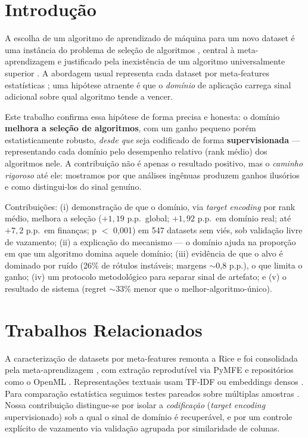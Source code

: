 \documentclass[12pt]{article}
\begin{document}
\section{Introdução}

A escolha de um algoritmo de aprendizado de máquina para um novo dataset é uma
instância do problema de seleção de algoritmos \cite{rice1976algorithm}, central
à meta-aprendizagem \cite{brazdil2009metalearning,vanschoren2018metalearning} e
justificado pela inexistência de um algoritmo universalmente superior
\cite{wolpert1996lack}. A abordagem usual representa cada dataset por
meta-features estatísticas \cite{alcobaca2020mfe}; uma hipótese atraente é que o
\emph{domínio} de aplicação carrega sinal adicional sobre qual algoritmo tende a
vencer.

Este trabalho confirma essa hipótese de forma precisa e honesta: o domínio
\textbf{melhora a seleção de algoritmos}, com um ganho pequeno porém
estatisticamente robusto, \emph{desde que} seja codificado de forma
\textbf{supervisionada} --- representando cada domínio pelo desempenho relativo
(rank médio) dos algoritmos nele. A contribuição não é apenas o resultado
positivo, mas o \emph{caminho rigoroso} até ele: mostramos por que análises
ingênuas produzem ganhos ilusórios e como distingui-los do sinal genuíno.

Contribuições: (i) demonstração de que o domínio, via \textit{target encoding} por
rank médio, melhora a seleção ($+1{,}19$ p.p.\ global; $+1{,}92$ p.p.\ em domínio
real; até $+7{,}2$ p.p.\ em finanças; p $<$ 0,001) em 547 datasets sem viés, sob
validação livre de vazamento; (ii) a explicação do mecanismo --- o domínio ajuda na
proporção em que um algoritmo domina aquele domínio; (iii) evidência de que o alvo
é dominado por ruído (26\% de rótulos instáveis; margens $\sim$0,8 p.p.), o que
limita o ganho; (iv) um protocolo metodológico para separar sinal de artefato; e (v)
o resultado de sistema (regret $\sim$33\% menor que o melhor-algoritmo-único).

\section{Trabalhos Relacionados}

A caracterização de datasets por meta-features remonta a Rice
\cite{rice1976algorithm} e foi consolidada pela meta-aprendizagem
\cite{brazdil2009metalearning,vanschoren2018metalearning}, com extração
reprodutível via PyMFE \cite{alcobaca2020mfe} e repositórios como o OpenML
\cite{vanschoren2014openml}. Representações textuais usam TF-IDF
\cite{salton1988term} ou embeddings densos \cite{reimers2019sentencebert}. Para
comparação estatística seguimos testes pareados sobre múltiplas amostras
\cite{demsar2006statistical}. Nossa contribuição distingue-se por isolar a
\emph{codificação} (\textit{target encoding} supervisionado) sob a qual o sinal
de domínio é recuperável, e por um controle explícito de vazamento via validação
agrupada por similaridade de colunas.
\end{document}
